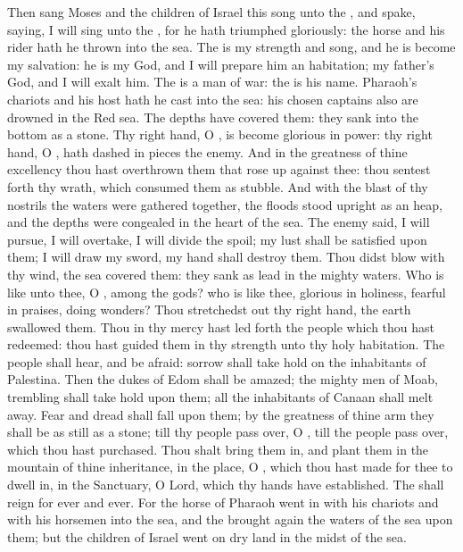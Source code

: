 \begin{biblechapter} %
 Then sang Moses and the children of Israel this song unto the \LORD, and spake, saying, I will sing unto the \LORD, for he hath triumphed gloriously: the horse and his rider hath he thrown into the sea.
\verse The \LORD is my strength and song, and he is become my salvation: he is my God, and I will prepare him an habitation; my father's God, and I will exalt him.
\verse The \LORD is a man of war: the \LORD is his name.
\verse Pharaoh's chariots and his host hath he cast into the sea: his chosen captains also are drowned in the Red sea.
\verse The depths have covered them: they sank into the bottom as a stone.
\verse Thy right hand, O \LORD, is become glorious in power: thy right hand, O \LORD, hath dashed in pieces the enemy.
\verse And in the greatness of thine excellency thou hast overthrown them that rose up against thee: thou sentest forth thy wrath, which consumed them as stubble.
\verse And with the blast of thy nostrils the waters were gathered together, the floods stood upright as an heap, and the depths were congealed in the heart of the sea.
\verse The enemy said, I will pursue, I will overtake, I will divide the spoil; my lust shall be satisfied upon them; I will draw my sword, my hand shall destroy them.
\verse Thou didst blow with thy wind, the sea covered them: they sank as lead in the mighty waters.
\verse Who is like unto thee, O \LORD, among the gods? who is like thee, glorious in holiness, fearful in praises, doing wonders?
\verse Thou stretchedst out thy right hand, the earth swallowed them.
\verse Thou in thy mercy hast led forth the people which thou hast redeemed: thou hast guided them in thy strength unto thy holy habitation.
\verse The people shall hear, and be afraid: sorrow shall take hold on the inhabitants of Palestina.
\verse Then the dukes of Edom shall be amazed; the mighty men of Moab, trembling shall take hold upon them; all the inhabitants of Canaan shall melt away.
\verse Fear and dread shall fall upon them; by the greatness of thine arm they shall be as still as a stone; till thy people pass over, O \LORD, till the people pass over, which thou hast purchased.
\verse Thou shalt bring them in, and plant them in the mountain of thine inheritance, in the place, O \LORD, which thou hast made for thee to dwell in, in the Sanctuary, O Lord, which thy hands have established.
\verse The \LORD shall reign for ever and ever.
\verse For the horse of Pharaoh went in with his chariots and with his horsemen into the sea, and the \LORD brought again the waters of the sea upon them; but the children of Israel went on dry land in the midst of the sea.

\end{biblechapter}
